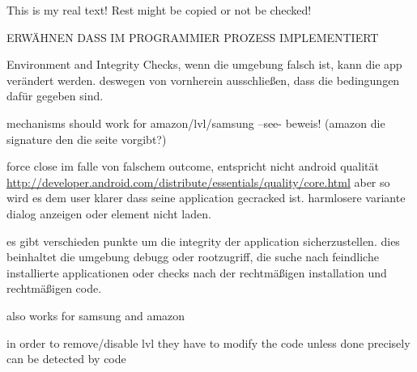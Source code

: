 This is my real text! Rest might be copied or not be checked!

ERWÄHNEN DASS IM PROGRAMMIER PROZESS  IMPLEMENTIERT\newline

Environment and Integrity Checks, wenn die umgebung falsch ist, kann die app verändert werden. deswegen von vornherein ausschließen, dass die bedingungen dafür gegeben sind.
\cite{munteanLicense}

mechanisms should work for amazon/lvl/samsung --see- beweis! (amazon die signature den die seite vorgibt?)

force close im falle von falschem outcome, entspricht nicht android qualität
\url{http://developer.android.com/distribute/essentials/quality/core.html} aber so wird es dem user klarer dass seine application gecracked ist. harmlosere variante dialog anzeigen oder element nicht laden.

es gibt verschieden punkte um die integrity der application sicherzustellen. dies beinhaltet die umgebung debugg oder rootzugriff, die suche nach feindliche installierte applicationen oder checks nach der rechtmäßigen installation und rechtmäßigen code.

also works for samsung and amazon

%
in order to remove/disable lvl they have to modify the code
unless done precisely can be detected by code
\cite{developersSecuring}
%
